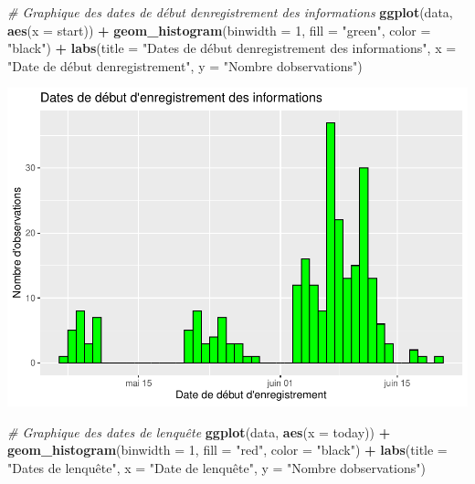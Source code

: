 \documentclass[
]{article}
\newenvironment{Shaded}{\begin{snugshade}}{\end{snugshade}}
\newcommand{\AttributeTok}[1]{\textcolor[rgb]{0.13,0.29,0.53}{#1}}
\newcommand{\CommentTok}[1]{\textcolor[rgb]{0.56,0.35,0.01}{\textit{#1}}}
\newcommand{\DecValTok}[1]{\textcolor[rgb]{0.00,0.00,0.81}{#1}}
\newcommand{\FunctionTok}[1]{\textcolor[rgb]{0.13,0.29,0.53}{\textbf{#1}}}
\newcommand{\NormalTok}[1]{#1}
\newcommand{\SpecialCharTok}[1]{\textcolor[rgb]{0.81,0.36,0.00}{\textbf{#1}}}
\newcommand{\StringTok}[1]{\textcolor[rgb]{0.31,0.60,0.02}{#1}}
\begin{document}
\begin{Shaded}
\begin{Highlighting}[]
\CommentTok{\# Graphique des dates de début d\textquotesingle{}enregistrement des informations}
\FunctionTok{ggplot}\NormalTok{(data, }\FunctionTok{aes}\NormalTok{(}\AttributeTok{x =}\NormalTok{ start)) }\SpecialCharTok{+}
  \FunctionTok{geom\_histogram}\NormalTok{(}\AttributeTok{binwidth =} \DecValTok{1}\NormalTok{, }\AttributeTok{fill =} \StringTok{"green"}\NormalTok{, }\AttributeTok{color =} \StringTok{"black"}\NormalTok{) }\SpecialCharTok{+}
  \FunctionTok{labs}\NormalTok{(}\AttributeTok{title =} \StringTok{"Dates de début d\textquotesingle{}enregistrement des informations"}\NormalTok{,}
       \AttributeTok{x =} \StringTok{"Date de début d\textquotesingle{}enregistrement"}\NormalTok{,}
       \AttributeTok{y =} \StringTok{"Nombre d\textquotesingle{}observations"}\NormalTok{)}
\end{Highlighting}
\end{Shaded}

\includegraphics{RMarkdown_files/figure-latex/unnamed-chunk-13-2.pdf}

\begin{Shaded}
\begin{Highlighting}[]
\CommentTok{\# Graphique des dates de l\textquotesingle{}enquête}
\FunctionTok{ggplot}\NormalTok{(data, }\FunctionTok{aes}\NormalTok{(}\AttributeTok{x =}\NormalTok{ today)) }\SpecialCharTok{+}
  \FunctionTok{geom\_histogram}\NormalTok{(}\AttributeTok{binwidth =} \DecValTok{1}\NormalTok{, }\AttributeTok{fill =} \StringTok{"red"}\NormalTok{, }\AttributeTok{color =} \StringTok{"black"}\NormalTok{) }\SpecialCharTok{+}
  \FunctionTok{labs}\NormalTok{(}\AttributeTok{title =} \StringTok{"Dates de l\textquotesingle{}enquête"}\NormalTok{,}
       \AttributeTok{x =} \StringTok{"Date de l\textquotesingle{}enquête"}\NormalTok{,}
       \AttributeTok{y =} \StringTok{"Nombre d\textquotesingle{}observations"}\NormalTok{)}
\end{Highlighting}
\end{Shaded}
\end{document}
